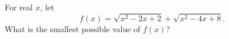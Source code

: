 For real $x$, let
\[
f(x)=\sqrt{x^2-2x+2}+\sqrt{x^2-4x+8}.
\]
What is the smallest possible value of $f(x)$?
